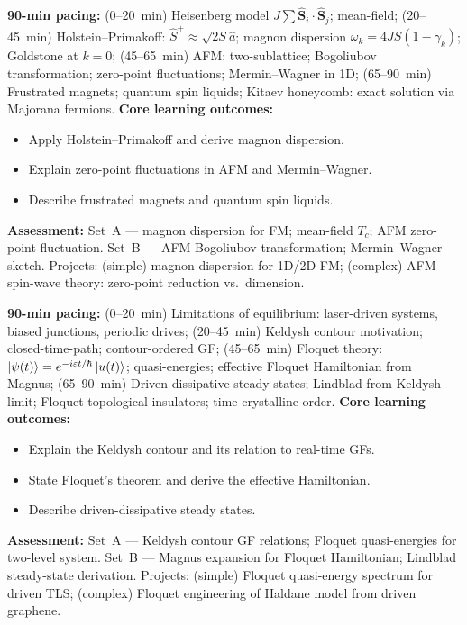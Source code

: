 \documentclass[11pt,a4paper]{article}
\begin{document}
\medskip

\begin{tcolorbox}[modulebox, title={Module~II.4 / L11: Quantum Magnetism}]
\textbf{90-min pacing:} (0--20~min) Heisenberg model $J\sum\hat{\mathbf{S}}_i\cdot\hat{\mathbf{S}}_j$; mean-field; (20--45~min) Holstein--Primakoff: $\hat{S}^+\approx\sqrt{2S}\hat{a}$; magnon dispersion $\omega_k=4JS(1-\gamma_k)$; Goldstone at $k=0$; (45--65~min) AFM: two-sublattice; Bogoliubov transformation; zero-point fluctuations; Mermin--Wagner in 1D; (65--90~min) Frustrated magnets; quantum spin liquids; Kitaev honeycomb: exact solution via Majorana fermions.
\medskip\textbf{Core learning outcomes:}
\begin{itemize}[leftmargin=1.4em,topsep=2pt,itemsep=1pt]
  \item Apply Holstein--Primakoff and derive magnon dispersion.
  \item Explain zero-point fluctuations in AFM and Mermin--Wagner.
  \item Describe frustrated magnets and quantum spin liquids.
\end{itemize}
\medskip\textbf{Assessment:}
Set~A --- magnon dispersion for FM; mean-field $T_c$; AFM zero-point fluctuation.
Set~B --- AFM Bogoliubov transformation; Mermin--Wagner sketch.
Projects: (simple) magnon dispersion for 1D/2D FM; (complex) AFM spin-wave theory: zero-point reduction vs.\ dimension.
\end{tcolorbox}

\medskip

\begin{tcolorbox}[modulebox, title={Module~II.4 / L12: Towards Non-Equilibrium}]
\textbf{90-min pacing:} (0--20~min) Limitations of equilibrium: laser-driven systems, biased junctions, periodic drives; (20--45~min) Keldysh contour motivation; closed-time-path; contour-ordered GF; (45--65~min) Floquet theory: $\ket{\psi(t)}=e^{-i\varepsilon t/\hbar}\ket{u(t)}$; quasi-energies; effective Floquet Hamiltonian from Magnus; (65--90~min) Driven-dissipative steady states; Lindblad from Keldysh limit; Floquet topological insulators; time-crystalline order.
\medskip\textbf{Core learning outcomes:}
\begin{itemize}[leftmargin=1.4em,topsep=2pt,itemsep=1pt]
  \item Explain the Keldysh contour and its relation to real-time GFs.
  \item State Floquet's theorem and derive the effective Hamiltonian.
  \item Describe driven-dissipative steady states.
\end{itemize}
\medskip\textbf{Assessment:}
Set~A --- Keldysh contour GF relations; Floquet quasi-energies for two-level system.
Set~B --- Magnus expansion for Floquet Hamiltonian; Lindblad steady-state derivation.
Projects: (simple) Floquet quasi-energy spectrum for driven TLS; (complex) Floquet engineering of Haldane model from driven graphene.
\end{tcolorbox}
\end{document}
